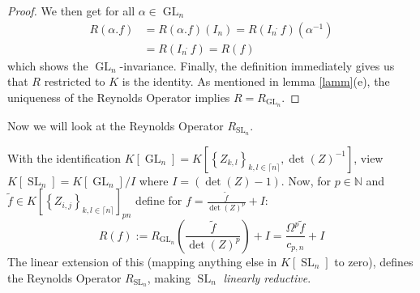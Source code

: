 \begin{proof}
  We then get for all $ \alpha \in \operatorname{GL}_n $
  \begin{equation}
    \begin{aligned}
      R \left( \alpha . f \right)
      &= R \left( \alpha . f \right) \left( I_n \right)
      = R \left( I_n \dot{\phantom{.}} f \right) \left( \alpha^{-1} \right) \\
      & = R \left( I_n \dot{\phantom{.}} f \right)
      = R (f)
    \end{aligned}
  \end{equation}
  which shows the $\operatorname{GL}_n$-invariance.
  Finally, the definition immediately gives us that $R$ restricted to $K$ is the identity.  As mentioned in lemma \ref{lamm}(e), the uniqueness of the Reynolds Operator implies $ R = R_{\operatorname{GL}_n} $.
\end{proof}

Now we will look at the Reynolds Operator $R_{\operatorname{SL}_n}$.

\begin{corollary}
  With the identification $ K \left\lbrack \operatorname{GL}_n \right\rbrack = K \left\lbrack \left\{ Z_{k,l} \right\}_{k,l \in \lceil n \rceil} , \operatorname{det} (Z) ^{-1} \right\rbrack $, view $ K \left\lbrack \operatorname{SL}_n \right\rbrack = K \left\lbrack \operatorname{GL}_n \right\rbrack / I $ where $ I = \left( \operatorname{det} (Z) -1 \right) $.
  Now, for $ p \in \mathbb{N} $ and $ \tilde{f} \in K \left\lbrack \left\{ Z_{i,j} \right\}_{k,l \in \lceil n \rceil} \right\rbrack_{pn} $ define for $ f = \frac{\tilde{f}}{\operatorname{det}(Z)^p} + I $:
  \begin{equation}
    R \left( f \right)
    := R_{\operatorname{GL}_n} \left( \frac{\tilde{f}}{\operatorname{det}(Z)^p} \right) + I
    = \frac{\Omega^p \tilde{f}}{c_{p,n}} + I
  \end{equation}
  The linear extension of this (mapping anything else in $K \left\lbrack \operatorname{SL}_n \right\rbrack$ to zero), defines the Reynolds Operator $R_{\operatorname{SL}_n}$, making $\operatorname{SL}_n$ \textit{linearly reductive}.
\end{corollary}

